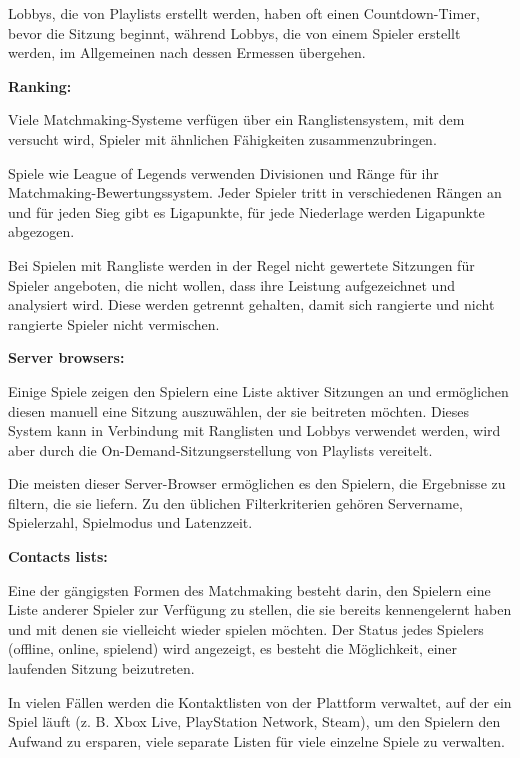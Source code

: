 Lobbys, die von Playlists erstellt werden, haben oft einen Countdown-Timer, bevor die Sitzung beginnt, während Lobbys, die von einem Spieler erstellt werden, im Allgemeinen nach dessen Ermessen übergehen.

\cite{Wikipedia.2021b}

\textbf{Ranking:}

Viele Matchmaking-Systeme verfügen über ein Ranglistensystem, mit dem versucht wird, Spieler mit ähnlichen Fähigkeiten zusammenzubringen.

Spiele wie League of Legends verwenden Divisionen und Ränge für ihr Matchmaking-Bewertungssystem. Jeder Spieler tritt in verschiedenen Rängen an und für jeden Sieg gibt es Ligapunkte, für jede Niederlage werden Ligapunkte abgezogen.

Bei Spielen mit Rangliste werden in der Regel nicht gewertete Sitzungen für Spieler angeboten, die nicht wollen, dass ihre Leistung aufgezeichnet und analysiert wird. Diese werden getrennt gehalten, damit sich rangierte und nicht rangierte Spieler nicht vermischen.

\cite{Wikipedia.2021b}

\textbf{Server browsers:}

Einige Spiele zeigen den Spielern eine Liste aktiver Sitzungen an und ermöglichen diesen manuell eine Sitzung auszuwählen, der sie beitreten möchten. Dieses System kann in Verbindung mit Ranglisten und Lobbys verwendet werden, wird aber durch die On-Demand-Sitzungserstellung von Playlists vereitelt.

Die meisten dieser Server-Browser ermöglichen es den Spielern, die Ergebnisse zu filtern, die sie liefern. Zu den üblichen Filterkriterien gehören Servername, Spielerzahl, Spielmodus und Latenzzeit. 

\cite{Wikipedia.2021b}

\textbf{Contacts lists:}

Eine der gängigsten Formen des Matchmaking besteht darin, den Spielern eine Liste anderer Spieler zur Verfügung zu stellen, die sie bereits kennengelernt haben und mit denen sie vielleicht wieder spielen möchten. Der Status jedes Spielers (offline, online, spielend) wird angezeigt, es besteht die Möglichkeit, einer laufenden Sitzung beizutreten.

In vielen Fällen werden die Kontaktlisten von der Plattform verwaltet, auf der ein Spiel läuft (z. B. Xbox Live, PlayStation Network, Steam), um den Spielern den Aufwand zu ersparen, viele separate Listen für viele einzelne Spiele zu verwalten.
\cite{Wikipedia.2021b}

